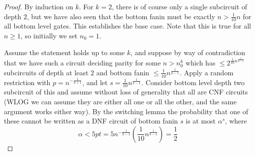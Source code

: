 \begin{proof}
	By induction on $k$. For $k=2$, there is of course only a single subcircuit of depth $2$, but we have also seen that the bottom fanin must be exactly $n > \frac{1}{10}n$ for all bottom level gates. This establishes the base case. Note that this is true for all $n \geq 1$, so initially we set $n_0 = 1$.  \par 
  Assume the statement holds up to some $k$, and suppose by way of contradiction that we have such a circuit deciding parity for some $n > n_0^k$ which has $\leq 2^{\frac{1}{10}n^{\frac{1}{k-1}}}$ subcircuits of depth at least $2$ and bottom fanin $\leq \frac{1}{10}n^{\frac{1}{k-1}}$. Apply a random restriction with $p = n^{-\frac{1}{k+1}}$, and let $s = \frac{1}{10}n^{\frac{1}{k-1}}$. Consider bottom level depth two subcircuit of this and assume without loss of generality that all are CNF circuits (WLOG we can assume they are either all one or all the other, and the same argument works either way). By the switching lemma the probability that one of these cannot be written as a DNF circuit of bottom fanin $s$ is at most $\alpha^s$, where 
  \[ \alpha < 5pt = 5n^{-\frac{1}{k-1}}(\frac{1}{10}n^{\frac{1}{k-1}}) = \frac{1}{2} \]


\end{proof}
